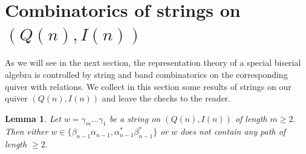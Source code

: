 \documentclass[11pt]{amsart}
\newtheorem{lemma}[theorem]{Lemma}
\theoremstyle{definition}
\begin{document}
\section{Combinatorics of strings on $(Q(n), I(n))$}\label{sec : string combinatorics}
As we will see in the next section, the representation theory of a special biserial algebra is controlled by string and band combinatorics on the corresponding quiver with relations. We collect in this section some results of strings on our quiver $(Q(n),I(n))$ and leave the checks to the reader.

\begin{lemma}%
Let $w=\gamma_m\ldots \gamma_1$ be a string on $(Q(n), I(n))$ of length $m\geq 2$. Then either $w\in\{\beta_{n-1}\alpha_{n-1}, \alpha_{n-1}^*\beta_{n-1}^*\}$ or $w$ does not contain any path of length $\geq 2$.
\end{lemma}
    
    
 
\end{document}
